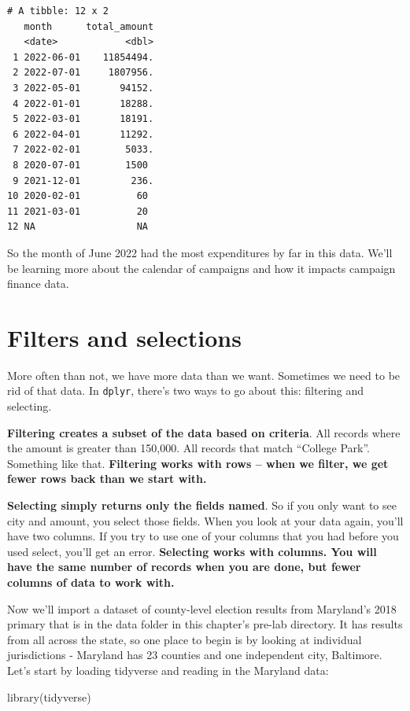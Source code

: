 \documentclass[
  letterpaper,
  DIV=11,
  numbers=noendperiod]{scrreprt}
\newenvironment{Shaded}{\begin{snugshade}}{\end{snugshade}}
\newcommand{\FunctionTok}[1]{\textcolor[rgb]{0.28,0.35,0.67}{#1}}
\newcommand{\NormalTok}[1]{\textcolor[rgb]{0.00,0.23,0.31}{#1}}
\begin{document}
\begin{verbatim}
# A tibble: 12 x 2
   month      total_amount
   <date>            <dbl>
 1 2022-06-01    11854494.
 2 2022-07-01     1807956.
 3 2022-05-01       94152.
 4 2022-01-01       18288.
 5 2022-03-01       18191.
 6 2022-04-01       11292.
 7 2022-02-01        5033.
 8 2020-07-01        1500 
 9 2021-12-01         236.
10 2020-02-01          60 
11 2021-03-01          20 
12 NA                  NA 
\end{verbatim}

So the month of June 2022 had the most expenditures by far in this data.
We'll be learning more about the calendar of campaigns and how it
impacts campaign finance data.


\hypertarget{filters-and-selections}{%
\chapter{Filters and selections}\label{filters-and-selections}}

More often than not, we have more data than we want. Sometimes we need
to be rid of that data. In \texttt{dplyr}, there's two ways to go about
this: filtering and selecting.

\textbf{Filtering creates a subset of the data based on criteria}. All
records where the amount is greater than 150,000. All records that match
``College Park''. Something like that. \textbf{Filtering works with rows
-- when we filter, we get fewer rows back than we start with.}

\textbf{Selecting simply returns only the fields named}. So if you only
want to see city and amount, you select those fields. When you look at
your data again, you'll have two columns. If you try to use one of your
columns that you had before you used select, you'll get an error.
\textbf{Selecting works with columns. You will have the same number of
records when you are done, but fewer columns of data to work with.}

Now we'll import a dataset of county-level election results from
Maryland's 2018 primary that is in the data folder in this chapter's
pre-lab directory. It has results from all across the state, so one
place to begin is by looking at individual jurisdictions - Maryland has
23 counties and one independent city, Baltimore. Let's start by loading
tidyverse and reading in the Maryland data:

\begin{Shaded}
\begin{Highlighting}[]
\FunctionTok{library}\NormalTok{(tidyverse)}
\end{Highlighting}
\end{Shaded}
\end{document}
